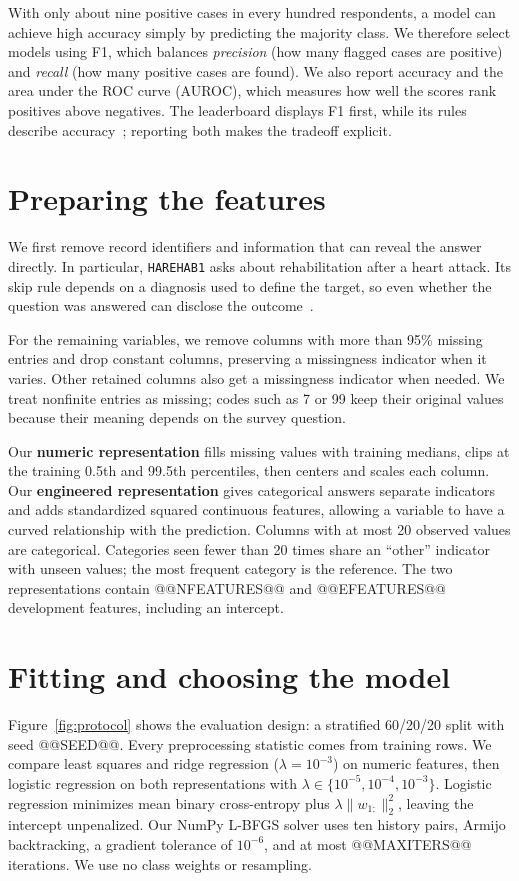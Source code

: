 \documentclass[10pt,a4paper]{article}
\begin{document}
With only about nine positive cases in every hundred respondents, a model can achieve high accuracy simply by predicting the majority class. We therefore select models using F1, which balances \emph{precision} (how many flagged cases are positive) and \emph{recall} (how many positive cases are found). We also report accuracy and the area under the ROC curve (AUROC), which measures how well the scores rank positives above negatives. The leaderboard displays F1 first, while its rules describe accuracy~\cite{board}; reporting both makes the tradeoff explicit.

\section{Preparing the features}
We first remove record identifiers and information that can reveal the answer directly. In particular, \texttt{HAREHAB1} asks about rehabilitation after a heart attack. Its skip rule depends on a diagnosis used to define the target, so even whether the question was answered can disclose the outcome~\cite{cdc}.

For the remaining variables, we remove columns with more than 95\% missing entries and drop constant columns, preserving a missingness indicator when it varies. Other retained columns also get a missingness indicator when needed. We treat nonfinite entries as missing; codes such as 7 or 99 keep their original values because their meaning depends on the survey question.

Our \textbf{numeric representation} fills missing values with training medians, clips at the training 0.5th and 99.5th percentiles, then centers and scales each column. Our \textbf{engineered representation} gives categorical answers separate indicators and adds standardized squared continuous features, allowing a variable to have a curved relationship with the prediction. Columns with at most 20 observed values are categorical. Categories seen fewer than 20 times share an ``other'' indicator with unseen values; the most frequent category is the reference. The two representations contain @@NFEATURES@@ and @@EFEATURES@@ development features, including an intercept.

\section{Fitting and choosing the model}
Figure~\ref{fig:protocol} shows the evaluation design: a stratified 60/20/20 split with seed @@SEED@@. Every preprocessing statistic comes from training rows. We compare least squares and ridge regression ($\lambda=10^{-3}$) on numeric features, then logistic regression on both representations with $\lambda\in\{10^{-5},10^{-4},10^{-3}\}$. Logistic regression minimizes mean binary cross-entropy plus $\lambda\|w_{1:}\|_2^2$, leaving the intercept unpenalized. Our NumPy L-BFGS solver uses ten history pairs, Armijo backtracking, a gradient tolerance of $10^{-6}$, and at most @@MAXITERS@@ iterations. We use no class weights or resampling.
\end{document}
